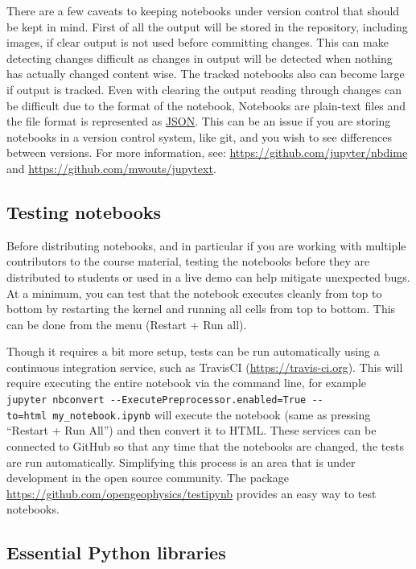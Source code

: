 \documentclass[]{book}
\begin{document}
There are a few caveats to keeping notebooks under version control that
should be kept in mind. First of all the output will be stored in the
repository, including images, if clear output is not used before
committing changes. This can make detecting changes difficult as changes
in output will be detected when nothing has actually changed content
wise. The tracked notebooks also can become large if output is tracked.
Even with clearing the output reading through changes can be difficult
due to the format of the notebook, Notebooks are plain-text files and
the file format is represented as \href{https://www.json.org/}{JSON}.
This can be an issue if you are storing notebooks in a version control
system, like git, and you wish to see differences between versions. For
more information, see: \url{https://github.com/jupyter/nbdime} and
\url{https://github.com/mwouts/jupytext}.

\subsection{Testing notebooks}\label{testing-notebooks}

Before distributing notebooks, and in particular if you are working with
multiple contributors to the course material, testing the notebooks
before they are distributed to students or used in a live demo can help
mitigate unexpected bugs. At a minimum, you can test that the notebook
executes cleanly from top to bottom by restarting the kernel and running
all cells from top to bottom. This can be done from the menu (Restart +
Run all).

Though it requires a bit more setup, tests can be run automatically
using a continuous integration service, such as TravisCI
(\url{https://travis-ci.org}). This will require executing the entire
notebook via the command line, for example
\texttt{jupyter\ nbconvert\ -\/-ExecutePreprocessor.enabled=True\ -\/-to=html\ my\_notebook.ipynb}
will execute the notebook (same as pressing ``Restart + Run All'') and
then convert it to HTML. These services can be connected to GitHub so
that any time that the notebooks are changed, the tests are run
automatically. Simplifying this process is an area that is under
development in the open source community. The package
\url{https://github.com/opengeophysics/testipynb} provides an easy way
to test notebooks.

\subsection{Essential Python
libraries}\label{essential-python-libraries}
\end{document}
